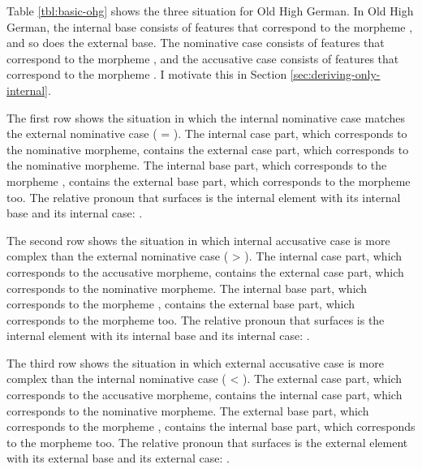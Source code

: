 Table \ref{tbl:basic-ohg} shows the three situation for Old High German. In Old High German, the internal base consists of features that correspond to the morpheme , and so does the external base. The nominative case consists of features that correspond to the morpheme , and the accusative case consists of features that correspond to the morpheme . I motivate this in Section \ref{sec:deriving-only-internal}.

The first row shows the situation in which the internal nominative case matches the external nominative case ( = ). The internal case part, which corresponds to the nominative  morpheme, contains the external case part, which corresponds to the nominative  morpheme. The internal base part, which corresponds to the morpheme , contains the external base part, which corresponds to the morpheme  too. The relative pronoun that surfaces is the internal element with its internal base and its internal case: .

The second row shows the situation in which internal accusative case is more complex than the external nominative case ( > ). The internal case part, which corresponds to the accusative  morpheme, contains the external case part, which corresponds to the nominative  morpheme. The internal base part, which corresponds to the morpheme , contains the external base part, which corresponds to the morpheme  too. The relative pronoun that surfaces is the internal element with its internal base and its internal case: .

The third row shows the situation in which external accusative case is more complex than the internal nominative case ( < ). The external case part, which corresponds to the accusative  morpheme, contains the internal case part, which corresponds to the nominative  morpheme. The external base part, which corresponds to the morpheme , contains the internal base part, which corresponds to the morpheme  too. The relative pronoun that surfaces is the external element with its external base and its external case: .

